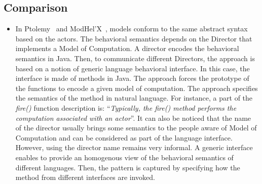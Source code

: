 	\subsection{Comparison}
		\begin{itemize}
		
			\item In Ptolemy~\cite{ptolemybib} and ModHel'X~\cite{modhelxbib}, models conform to the same abstract syntax based on the actors. The behavioral semantics depends on the Director that implements a Model of Computation. A director encodes the behavioral semantics in Java. Then, to communicate different Directors, the approach is based on a notion of generic language behavioral interface. In this case, the interface is made of methods in Java. The approach forces the prototype of the functions to encode a given model of computation. The approach specifies the semantics of the method in natural language. For instance, a part of the \emph{fire()} function description is: ``\emph{Typically, the fire() method performs the computation associated with an actor}''. It can also be noticed that the name of the director usually brings some semantics to the people aware of Model of Computation and can be considered as part of the language interface. However, using the director name remains very informal. A generic interface enables to provide an homogenous view of the behavioral semantics of different languages. Then, the pattern is captured by specifying how the method from different interfaces are invoked. 
			
			

\end{itemize}
